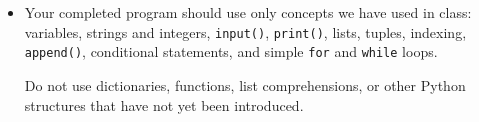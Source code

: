 \documentclass{article}
\begin{document}
\begin{enumerate}
\begin{itemize}
\item Your completed program should use only concepts we
have used in class: variables, strings and integers,
\texttt{input()}, \texttt{print()}, lists, tuples,
indexing, \texttt{append()}, conditional statements, and
simple \texttt{for} and \texttt{while} loops.

Do not use dictionaries, functions, list comprehensions, or
other Python structures that have not yet been introduced.

\end{itemize}
\end{enumerate}
\end{document}
